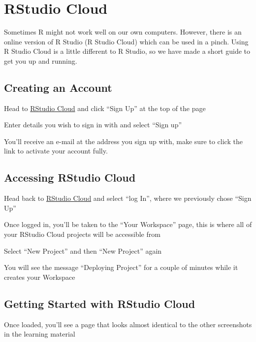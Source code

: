 \documentclass[]{book}
\begin{document}
\hypertarget{appendix-appendices}{%
\appendix}


\hypertarget{rstudio-cloud}{%
\chapter{RStudio Cloud}\label{rstudio-cloud}}

Sometimes R might not work well on our own computers. However, there is an online version of R Studio (R Studio Cloud) which can be used in a pinch. Using R Studio Cloud is a little different to R Studio, so we have made a short guide to get you up and running.

\hypertarget{creating-an-account}{%
\section{Creating an Account}\label{creating-an-account}}

Head to \href{https://rstudio.cloud/}{RStudio Cloud} and click ``Sign Up'' at the top of the page

Enter details you wish to sign in with and select ``Sign up''

You'll receive an e-mail at the address you sign up with, make sure to click the link to activate your account fully.

\hypertarget{accessing-rstudio-cloud}{%
\section{Accessing RStudio Cloud}\label{accessing-rstudio-cloud}}

Head back to \href{https://rstudio.cloud/}{RStudio Cloud} and select ``log In'', where we previously chose ``Sign Up''

Once logged in, you'll be taken to the ``Your Workspace'' page, this is where all of your RStudio Cloud projects will be accessible from

Select ``New Project'' and then ``New Project'' again

You will see the message ``Deploying Project'' for a couple of minutes while it creates your Workspace

\hypertarget{getting-started-with-rstudio-cloud}{%
\section{Getting Started with RStudio Cloud}\label{getting-started-with-rstudio-cloud}}

Once loaded, you'll see a page that looks almost identical to the other screenshots in the learning material
\end{document}
